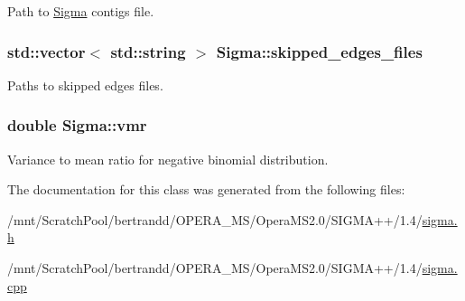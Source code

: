 \label{classSigma_a57d2b73a5f595d5a91fab60d5663b0e0}
Path to \hyperlink{classSigma}{Sigma} contigs file. \hypertarget{classSigma_a63939e07896d76725a80c6ad94df53da}{
\subsubsection[{skipped\_\-edges\_\-files}]{\setlength{\rightskip}{0pt plus 5cm}std::vector$<$ std::string $>$ {\bf Sigma::skipped\_\-edges\_\-files}}}
\label{classSigma_a63939e07896d76725a80c6ad94df53da}
Paths to skipped edges files. \hypertarget{classSigma_a8c00846e88a130c77f0e7cad5c50a187}{
\subsubsection[{vmr}]{\setlength{\rightskip}{0pt plus 5cm}double {\bf Sigma::vmr}}}
\label{classSigma_a8c00846e88a130c77f0e7cad5c50a187}
Variance to mean ratio for negative binomial distribution. 

The documentation for this class was generated from the following files:\begin{DoxyCompactItemize}
\item 
/mnt/ScratchPool/bertrandd/OPERA\_\-MS/OperaMS2.0/SIGMA++/1.4/\hyperlink{sigma_8h}{sigma.h}\item 
/mnt/ScratchPool/bertrandd/OPERA\_\-MS/OperaMS2.0/SIGMA++/1.4/\hyperlink{sigma_8cpp}{sigma.cpp}\end{DoxyCompactItemize}
